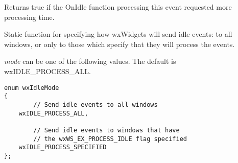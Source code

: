 \label{wxidleeventmorerequested}


Returns true if the OnIdle function processing this event requested more processing time.



\label{wxidleeventsetmode}


Static function for specifying how wxWidgets will send idle events: to
all windows, or only to those which specify that they
will process the events.

{\it mode} can be one of the following values.
The default is wxIDLE\_PROCESS\_ALL.

\begin{verbatim}
enum wxIdleMode
{
        // Send idle events to all windows
    wxIDLE_PROCESS_ALL,

        // Send idle events to windows that have
        // the wxWS_EX_PROCESS_IDLE flag specified
    wxIDLE_PROCESS_SPECIFIED
};
\end{verbatim}

